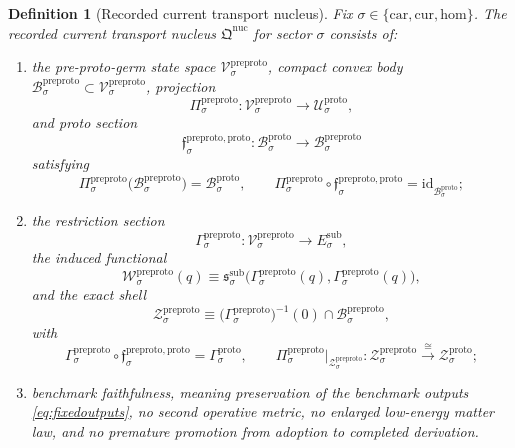 \documentclass[11pt]{article}
\newcommand{\Car}{\mathrm{car}}
\newcommand{\Cur}{\mathrm{cur}}
\newcommand{\Hom}{\mathrm{hom}}
\newcommand{\SubTarget}[1]{E_{#1}^{\mathrm{sub}}}
\newcommand{\SubPair}[1]{\mathfrak s_{#1}^{\mathrm{sub}}}
\newcommand{\ProtoSpace}[1]{\mathcal U_{#1}^{\mathrm{proto}}}
\newcommand{\ProtoBody}[1]{\mathcal B_{#1}^{\mathrm{proto}}}
\newcommand{\ProtoSection}[1]{\Gamma_{#1}^{\mathrm{proto}}}
\newcommand{\ProtoShellSet}[1]{\mathcal Z_{#1}^{\mathrm{proto}}}
\newcommand{\PreProtoNucleus}{\mathfrak Q^{\mathrm{nuc}}}
\newcommand{\PreProtoSpace}[1]{\mathcal V_{#1}^{\mathrm{preproto}}}
\newcommand{\PreProtoBody}[1]{\mathcal B_{#1}^{\mathrm{preproto}}}
\newcommand{\PreProtoProj}[1]{\Pi_{#1}^{\mathrm{preproto}}}
\newcommand{\PreProtoProtoMin}[1]{\mathfrak f_{#1}^{\mathrm{preproto,proto}}}
\newcommand{\PreProtoSection}[1]{\Gamma_{#1}^{\mathrm{preproto}}}
\newcommand{\PreProtoFunctional}[1]{\mathscr W_{#1}^{\mathrm{preproto}}}
\newcommand{\PreProtoShellSet}[1]{\mathcal Z_{#1}^{\mathrm{preproto}}}
\newtheorem{definition}{Definition}
\begin{document}
\begin{definition}[Recorded current transport nucleus]
\label{def:nucleus}
Fix \(\sigma\in\{\Car,\Cur,\Hom\}\). The recorded current transport nucleus \(\PreProtoNucleus\) for sector \(\sigma\) consists of:
\begin{enumerate}
    \item the pre-proto-germ state space \(\PreProtoSpace{\sigma}\), compact convex body \(\PreProtoBody{\sigma}\subset\PreProtoSpace{\sigma}\), projection
    \[
    \PreProtoProj{\sigma}:\PreProtoSpace{\sigma}\to\ProtoSpace{\sigma},
    \]
    and proto section
    \[
    \PreProtoProtoMin{\sigma}:\ProtoBody{\sigma}\to\PreProtoBody{\sigma}
    \]
    satisfying
    \[
    \PreProtoProj{\sigma}\bigl(\PreProtoBody{\sigma}\bigr)=\ProtoBody{\sigma},
    \qquad
    \PreProtoProj{\sigma}\circ\PreProtoProtoMin{\sigma}
    =
    \mathrm{id}_{\ProtoBody{\sigma}};
    \]
    \item the restriction section
    \[
    \PreProtoSection{\sigma}:\PreProtoSpace{\sigma}\to\SubTarget{\sigma},
    \]
    the induced functional
    \[
    \PreProtoFunctional{\sigma}(q)
    \equiv
    \SubPair{\sigma}\bigl(\PreProtoSection{\sigma}(q),\PreProtoSection{\sigma}(q)\bigr),
    \]
    and the exact shell
    \[
    \PreProtoShellSet{\sigma}
    \equiv
    \bigl(\PreProtoSection{\sigma}\bigr)^{-1}(0)\cap\PreProtoBody{\sigma},
    \]
    with
    \[
    \PreProtoSection{\sigma}\circ\PreProtoProtoMin{\sigma}
    =
    \ProtoSection{\sigma},
    \qquad
    \PreProtoProj{\sigma}\big|_{\PreProtoShellSet{\sigma}}
    :
    \PreProtoShellSet{\sigma}
    \xrightarrow{\cong}
    \ProtoShellSet{\sigma};
    \]
    \item benchmark faithfulness, meaning preservation of the benchmark outputs \eqref{eq:fixedoutputs}, no second operative metric, no enlarged low-energy matter law, and no premature promotion from adoption to completed derivation.
\end{enumerate}
\end{definition}
\end{document}
